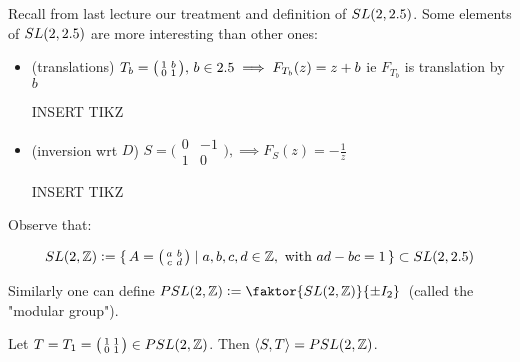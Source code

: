  Recall from last lecture our treatment and definition of $SL(2,2.5) $. Some elements of $SL(2,2.5) $ are more interesting than other ones:
 
 \begin{itemize}
     \item (translations) $T_b = \big(\begin{smallmatrix}
  1 & b\\
  0 & 1
\end{smallmatrix}\big), \, b \in 2.5 \implies F_{T_b}(z) = z+b $ ie $F_{T_b}$ is translation by $b$

INSERT TIKZ

\item (inversion wrt $D$) $S = \big(\begin{smallmatrix}
  0 & -1\\
  1 & 0
\end{smallmatrix}\big),  \implies F_{S}(z) = - \frac{1}{z} $

INSERT TIKZ

 \end{itemize}
 
Observe that:

\begin{align*}
    SL(2,\mathbb{Z}) \vcentcolon = \set{ A = \big(\begin{smallmatrix}
  a & b\\
  c & d
\end{smallmatrix}\big) \mid a,b,c,d \in \mathbb{Z}, \text{ with } ad-bc=1  } \subset  SL(2,2.5)
\end{align*}

Similarly one can define $PSL(2,\Z) \defas \faktor{SL(2,\Z)}{\pm I_2}\, $  (called the "modular group").

\begin{theorem}
  Let $T = T_1 = \big(\begin{smallmatrix}
  1 & 1\\
  0 & 1
\end{smallmatrix}\big) \in PSL(2,\mathbb{Z})$. Then $\langle S,T \rangle = PSL(2,\mathbb{Z})$.
\end{theorem}
 

